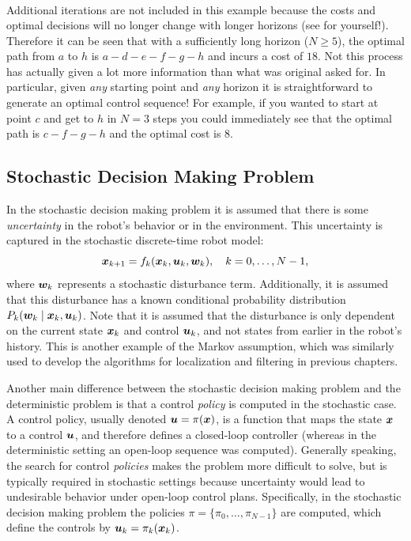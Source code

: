 \begin{example}
\begin{equation*}
\begin{split}
\end{split}
\end{equation*}
Additional iterations are not included in this example because the costs and optimal decisions will no longer change with longer horizons (see for yourself!). Therefore it can be seen that with a sufficiently long horizon ($N \geq 5$), the optimal path from $a$ to $h$ is $a-d-e-f-g-h$ and incurs a cost of $18$. Not this process has actually given a lot more information than what was original asked for. In particular, given \textit{any} starting point and \textit{any} horizon it is straightforward to generate an optimal control sequence! For example, if you wanted to start at point $c$ and get to $h$ in $N=3$ steps you could immediately see that the optimal path is $c-f-g-h$ and the optimal cost is $8$.
\end{example}


\subsection{Stochastic Decision Making Problem}
In the stochastic decision making problem it is assumed that there is some \textit{uncertainty} in the robot's behavior or in the environment. This uncertainty is captured in the stochastic discrete-time robot model:
\begin{equation} \label{eq:smodel}
\bm{x}_{k+1}= f_k(\bm{x}_k, \bm{u}_k, \bm{w}_k), \quad k = 0, \dots, N-1,
\end{equation}
where $\bm{w}_k$ represents a stochastic disturbance term. Additionally, it is assumed that this disturbance has a known conditional probability distribution $P_k(\bm{w}_k \mid \bm{x}_k, \bm{u}_k)$. Note that it is assumed that the disturbance is only dependent on the current state $\bm{x}_k$ and control $\bm{u}_k$, and not states from earlier in the robot's history. This is another example of the Markov assumption, which was similarly used to develop the algorithms for localization and filtering in previous chapters.

Another main difference between the stochastic decision making problem and the deterministic problem is that a control \textit{policy} is computed in the stochastic case. A control policy, usually denoted $\bm{u} = \pi(\bm{x})$, is a function that maps the state $\bm{x}$ to a control $\bm{u}$, and therefore defines a closed-loop controller (whereas in the deterministic setting an open-loop sequence was computed). Generally speaking, the search for control \textit{policies} makes the problem more difficult to solve, but is typically required in stochastic settings because uncertainty would lead to undesirable behavior under open-loop control plans. Specifically, in the stochastic decision making problem the policies $\pi = \{\pi_0, \dots, \pi_{N-1}\}$ are computed, which define the controls by $\bm{u}_k = \pi_k(\bm{x}_k)$.

